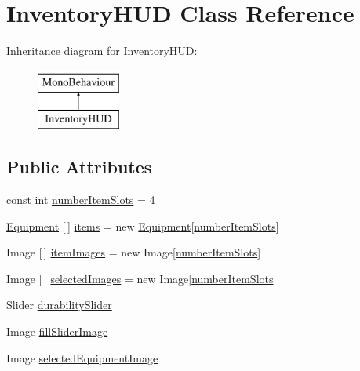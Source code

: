 \hypertarget{class_inventory_h_u_d}{}\section{Inventory\+H\+UD Class Reference}
\label{class_inventory_h_u_d}
Inheritance diagram for Inventory\+H\+UD\+:\begin{figure}[H]
\begin{center}
\leavevmode
\includegraphics[height=2.000000cm]{class_inventory_h_u_d}
\end{center}
\end{figure}
\subsection*{Public Attributes}
\begin{DoxyCompactItemize}
\item 
const int \mbox{\hyperlink{class_inventory_h_u_d_a77d964ce00ac7306d8193216e1f18262}{number\+Item\+Slots}} = 4
\item 
\mbox{\hyperlink{class_equipment}{Equipment}} \mbox{[}$\,$\mbox{]} \mbox{\hyperlink{class_inventory_h_u_d_a6036a9e3a9bb86dd5e33e733d62e27ee}{items}} = new \mbox{\hyperlink{class_equipment}{Equipment}}\mbox{[}\mbox{\hyperlink{class_inventory_h_u_d_a77d964ce00ac7306d8193216e1f18262}{number\+Item\+Slots}}\mbox{]}
\item 
Image \mbox{[}$\,$\mbox{]} \mbox{\hyperlink{class_inventory_h_u_d_a8e6d4060a9d30152170fce6fd6a00b9e}{item\+Images}} = new Image\mbox{[}\mbox{\hyperlink{class_inventory_h_u_d_a77d964ce00ac7306d8193216e1f18262}{number\+Item\+Slots}}\mbox{]}
\item 
Image \mbox{[}$\,$\mbox{]} \mbox{\hyperlink{class_inventory_h_u_d_a0edf11c38f1debf4bb69f9f976f3ab48}{selected\+Images}} = new Image\mbox{[}\mbox{\hyperlink{class_inventory_h_u_d_a77d964ce00ac7306d8193216e1f18262}{number\+Item\+Slots}}\mbox{]}
\item 
Slider \mbox{\hyperlink{class_inventory_h_u_d_ab1daf2cb65cf786f5a1582ae2cfbc712}{durability\+Slider}}
\item 
Image \mbox{\hyperlink{class_inventory_h_u_d_a2c1ae2a91a41e06ebe67e0490833f447}{fill\+Slider\+Image}}
\item 
Image \mbox{\hyperlink{class_inventory_h_u_d_a80bf1b719c37d2b3cdeec5b8461d1533}{selected\+Equipment\+Image}}
\end{DoxyCompactItemize}


